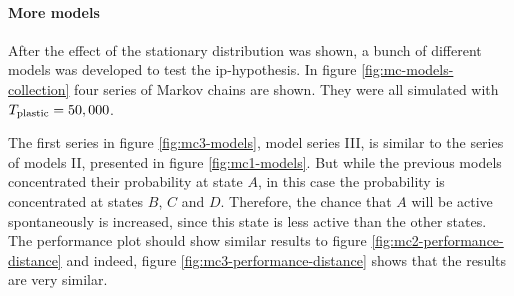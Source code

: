 \paragraph{More models}

After the effect of the stationary distribution was shown, a bunch of different models was developed to test the \acs{ip}-hypothesis. In figure \ref{fig:mc-models-collection} four series of Markov chains are shown. They were all simulated with $T_{\text{plastic}} = 50,000$.

The first series in figure \ref{fig:mc3-models}, model series III, is similar to the series of models II, presented in figure \ref{fig:mc1-models}. But while the previous models concentrated their probability at state $A$, in this case the probability is concentrated at states $B$, $C$ and $D$. Therefore, the chance that $A$ will be active spontaneously is increased, since this state is less active than the other states. The performance plot should show similar results to figure \ref{fig:mc2-performance-distance} and indeed, figure \ref{fig:mc3-performance-distance} shows that the results are very similar.

